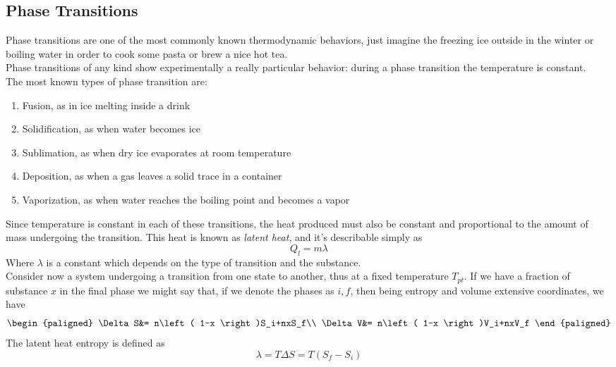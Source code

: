 \documentclass[../qm.tex]{subfiles}
\begin{document}
\subsection{Phase Transitions}
Phase transitions are one of the most commonly known thermodynamic behaviors, just imagine the freezing ice outside in the winter or boiling water in order to cook some pasta or brew a nice hot tea.\\
Phase transitions of any kind show experimentally a really particular behavior: during a phase transition the temperature is constant.\\
The most known types of phase transition are:
\begin{enumerate}
\item Fusion, as in ice melting inside a drink
\item Solidification, as when water becomes ice
\item Sublimation, as when dry ice evaporates at room temperature
\item Deposition, as when a gas leaves a solid trace in a container
\item Vaporization, as when water reaches the boiling point and becomes a vapor
\end{enumerate}
Since temperature is constant in each of these transitions, the heat produced must also be constant and proportional to the amount of mass undergoing the transition. This heat is known as \textit{latent heat}, and it's describable simply as
\begin{equation}
	Q_l=m\lambda
	\label{eq:latentheat.pt}
\end{equation}
Where $\lambda$ is a constant which depends on the type of transition and the substance.\\
Consider now a system undergoing a transition from one state to another, thus at a fixed temperature $T_{pt}$. If we have a fraction of substance $x$ in the final phase we might say that, if we denote the phases as $i, f$, then being entropy and volume extensive coordinates, we have
\begin{equation*}
	\begin{paligned}
		\Delta S&= n\left( 1-x \right)S_i+nxS_f\\
		\Delta V&= n\left( 1-x \right)V_i+nxV_f		
	\end{paligned}
\end{equation*}
The latent heat entropy is defined as
\begin{equation}
	\lambda=T\Delta S= T\left( S_f-S_i \right)
	\label{eq:latentheat.pt}
\end{equation}
\end{document}
